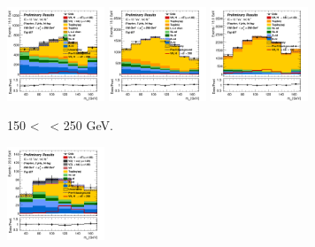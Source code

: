 \begin{figure}[h!]
    \centering
    \begin{subfigure}[b]{\textwidth}
        \centering
        \includegraphics[width=0.32\textwidth]{Images/VH/Own_fit/postfit_VHcc/Region_distmBB_BMax250_BMin150_DtopCRBC_J2_TTypebt_T1_L0_Y6051_GlobalFit_conditionnal_mu1.png}
        \includegraphics[width=0.32\textwidth]{Images/VH/Own_fit/postfit_VHcc/Region_distmBB_BMax250_BMin150_DtopCRBC_J3_TTypebt_T1_L0_Y6051_GlobalFit_conditionnal_mu1.png}
        \includegraphics[width=0.32\textwidth]{Images/VH/Own_fit/postfit_VHbb/Region_distmBB_BMax250_BMin150_DtopCRBC_J4_TTypebt_T1_L0_Y6051_GlobalFit_conditionnal_mu1.png} %
        \caption{150 < \ptv\ < 250 GeV.}
        \label{fig:plots_VHcc_OL_150_TopCR_2c}
    \end{subfigure}
    \begin{subfigure}[b]{\textwidth}
        \centering
        \includegraphics[width=0.32\textwidth]{Images/VH/Own_fit/postfit_VHcc/Region_distmBB_BMax400_BMin250_DtopCRBC_J2_TTypebt_T1_L0_Y6051_GlobalFit_conditionnal_mu1.png}

\end{subfigure}
\end{figure}
